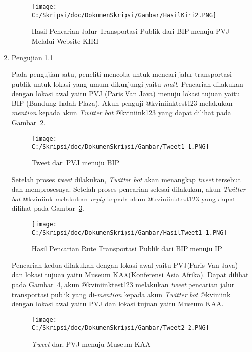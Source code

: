 \begin{enumerate}
	\begin{figure}
		\centering
			\texttt{[image: C:/Skripsi/doc/DokumenSkripsi/Gambar/HasilKiri2.PNG]}
		\caption{Hasil Pencarian Jalur Transportasi Publik dari BIP menuju PVJ Melalui Website KIRI}
		\label{fig:HasilKiri2}
	\end{figure}
	\clearpage
	
	\item Pengujian 1.1
	
	Pada pengujian satu, peneliti mencoba untuk mencari jalur transportasi publik untuk lokasi yang umum dikunjungi yaitu \textit{mall}. Pencarian dilakukan dengan lokasi awal yaitu PVJ (Paris Van Java) menuju lokasi tujuan yaitu BIP (Bandung Indah Plaza). Akun penguji @kviniinktest123 melakukan \textit{mention} kepada akun \textit{Twitter bot} @kviniink123 yang dapat dilihat pada Gambar~\ref{fig:Tweet1_1}.
	
	\begin{figure}
		\centering
			\texttt{[image: C:/Skripsi/doc/DokumenSkripsi/Gambar/Tweet1\_1.PNG]}
		\caption{Tweet dari PVJ menuju BIP}
		\label{fig:Tweet1_1}
	\end{figure}
	
	Setelah proses \textit{tweet} dilakukan, \textit{Twitter bot} akan menangkap \textit{tweet} tersebut dan memprosesnya. Setelah proses pencarian selesai dilakukan, akun \textit{Twitter bot} @kviniink melakukan \textit{reply} kepada akun @kviniinktest123 yang dapat dilihat pada Gambar~\ref{fig:HasilTweet1_1}. 
	
		
	\begin{figure}
		\centering
			\texttt{[image: C:/Skripsi/doc/DokumenSkripsi/Gambar/HasilTweet1\_1.PNG]}
		\caption{Hasil Pencarian Rute Transportasi Publik dari BIP menuju IP}
		\label{fig:HasilTweet1_1}
	\end{figure}
	
	Pencarian kedua dilakukan dengan lokasi awal yaitu PVJ(Paris Van Java) dan lokasi tujuan yaitu Museum KAA(Konferensi Asia Afrika). Dapat dilihat pada Gambar~\ref{fig:Tweet2_2}, akun @kviniinktest123 melakukan \textit{tweet} pencarian jalur transportasi publik yang di-\textit{mention} kepada akun \textit{Twitter bot} @kviniink dengan lokasi awal yaitu PVJ dan lokasi tujuan yaitu Museum KAA.
	
	\begin{figure}
		\centering
			\texttt{[image: C:/Skripsi/doc/DokumenSkripsi/Gambar/Tweet2\_2.PNG]}
		\caption{\textit{Tweet} dari PVJ menuju Museum KAA}
		\label{fig:Tweet2_2}
	\end{figure}
	

\end{enumerate}
